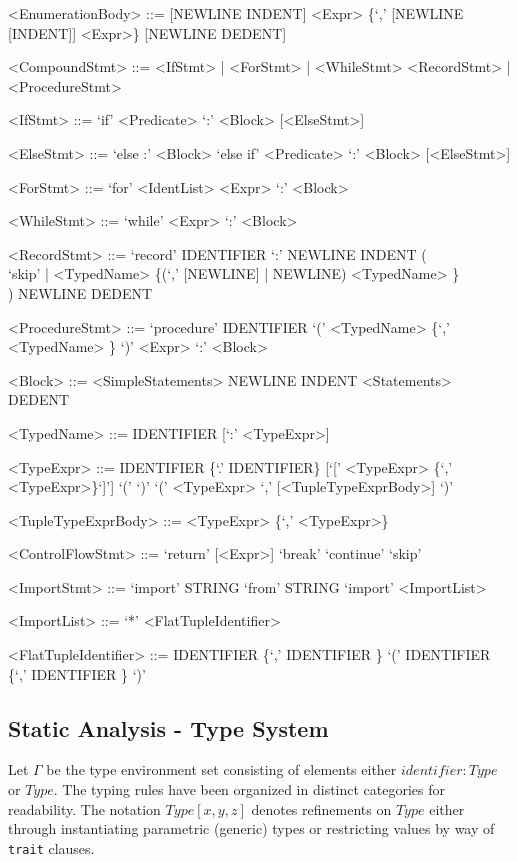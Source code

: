 \documentclass{article}
\begin{document}
\begin{grammar}
<EnumerationBody> ::= [NEWLINE INDENT] <Expr> \{`,' [NEWLINE [INDENT]] <Expr>\} [NEWLINE DEDENT]

<CompoundStmt> ::= <IfStmt> | <ForStmt> | <WhileStmt>
    \alt <RecordStmt> | <ProcedureStmt>

<IfStmt> ::= `if' <Predicate> `:' <Block> [<ElseStmt>]

<ElseStmt> ::= `else :' <Block>
    \alt `else if' <Predicate> `:' <Block> [<ElseStmt>]

<ForStmt> ::= `for' <IdentList> \lit{$\in$} <Expr> `:' <Block>

<WhileStmt> ::= `while' <Expr> `:' <Block>

<RecordStmt> ::= `record' IDENTIFIER `:' NEWLINE INDENT ( \\
        `skip' | <TypedName> \{(`,' [NEWLINE] | NEWLINE) <TypedName> \} \\
    ) NEWLINE DEDENT

<ProcedureStmt> ::= `procedure' IDENTIFIER `(' <TypedName> \{`,' <TypedName> \} `)' \lit{$\rightarrow$} <Expr> `:' <Block>

<Block> ::= <SimpleStatements>
    \alt NEWLINE INDENT <Statements> DEDENT

<TypedName> ::= IDENTIFIER [`:' <TypeExpr>]

<TypeExpr> ::= IDENTIFIER \{`.' IDENTIFIER\} [`[' <TypeExpr> \{`,' <TypeExpr>\}`]']
    \alt `(' `)'
    \alt `(' <TypeExpr> `,' [<TupleTypeExprBody>] `)'

<TupleTypeExprBody> ::= <TypeExpr> \{`,' <TypeExpr>\}

<ControlFlowStmt> ::= `return' [<Expr>]
    \alt `break'
    \alt `continue'
    \alt `skip'

<ImportStmt> ::= `import' STRING
    \alt `from' STRING `import' <ImportList>

<ImportList> ::= `*'
    \alt <FlatTupleIdentifier>

<FlatTupleIdentifier> ::= IDENTIFIER \{`,' IDENTIFIER \}
    \alt `(' IDENTIFIER \{`,' IDENTIFIER \} `)'

\end{grammar}


\subsection{Static Analysis - Type System}
Let $\Gamma$ be the type environment set consisting of elements either $identifier: Type$ or $Type$. The typing rules have been organized in distinct categories for readability. The notation $Type[x, y, z]$ denotes refinements on $Type$ either through instantiating parametric (generic) types or restricting values by way of \texttt{trait} clauses.
\end{document}
